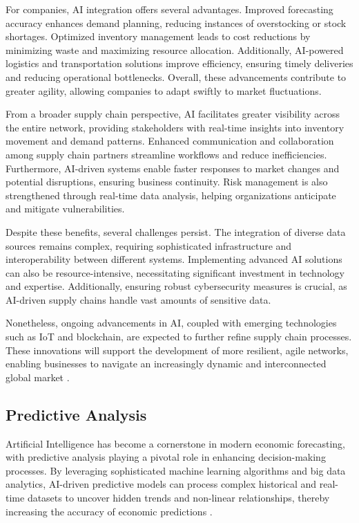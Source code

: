 For companies, AI integration offers several advantages. Improved forecasting accuracy enhances demand planning, reducing instances of overstocking or stock shortages. Optimized inventory management leads to cost reductions by minimizing waste and maximizing resource allocation. Additionally, AI-powered logistics and transportation solutions improve efficiency, ensuring timely deliveries and reducing operational bottlenecks. Overall, these advancements contribute to greater agility, allowing companies to adapt swiftly to market fluctuations.

From a broader supply chain perspective, AI facilitates greater visibility across the entire network, providing stakeholders with real-time insights into inventory movement and demand patterns. Enhanced communication and collaboration among supply chain partners streamline workflows and reduce inefficiencies. Furthermore, AI-driven systems enable faster responses to market changes and potential disruptions, ensuring business continuity. Risk management is also strengthened through real-time data analysis, helping organizations anticipate and mitigate vulnerabilities.

Despite these benefits, several challenges persist. The integration of diverse data sources remains complex, requiring sophisticated infrastructure and interoperability between different systems. Implementing advanced AI solutions can also be resource-intensive, necessitating significant investment in technology and expertise. Additionally, ensuring robust cybersecurity measures is crucial, as AI-driven supply chains handle vast amounts of sensitive data.

Nonetheless, ongoing advancements in AI, coupled with emerging technologies such as IoT and blockchain, are expected to further refine supply chain processes. These innovations will support the development of more resilient, agile networks, enabling businesses to navigate an increasingly dynamic and interconnected global market \cite{IBM-AI-Supply-Chain}.


\subsection{Predictive Analysis}
\label{subsec:predictive-analysis}

Artificial Intelligence has become a cornerstone in modern economic forecasting, with predictive analysis playing a pivotal role in enhancing decision-making processes. 
By leveraging sophisticated machine learning algorithms and big data analytics, AI-driven predictive models can process complex historical and real-time datasets to 
uncover hidden trends and non-linear relationships, thereby increasing the accuracy of economic predictions \cite{Predictive-Analysis-ai}. 

